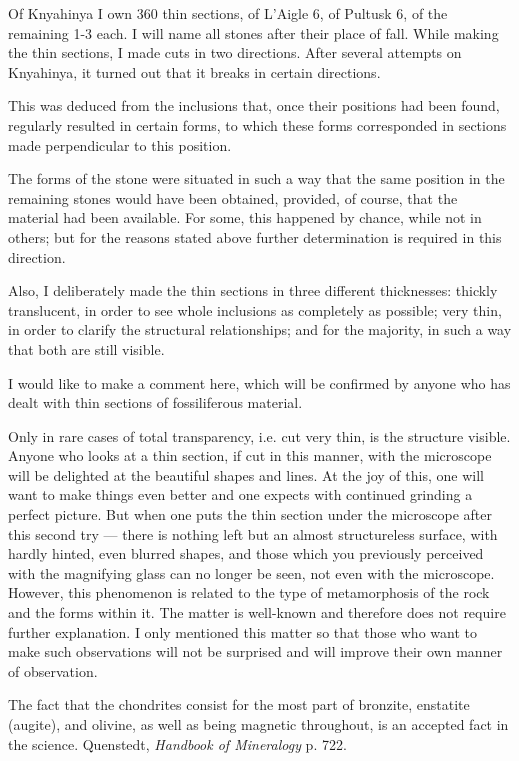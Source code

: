 \documentclass[a4paper, 12pt, oneside]{article}
\begin{document}
Of Knyahinya I own 360 thin sections, of L'Aigle 6, of Pultusk 6, of the remaining 1-3 each. I will name all stones after their place of fall. While making the thin sections, I made cuts in two directions. After several attempts on Knyahinya, it turned out that it breaks in certain directions.

This was deduced from the inclusions that, once their positions had been found, regularly resulted in certain forms, to which these forms corresponded in sections made perpendicular to this position.

The forms of the stone were situated in such a way that the same position in the remaining stones would have been obtained, provided, of course, that the material had been available. For some, this happened by chance, while not in others; but for the reasons stated above further determination is required in this direction.

Also, I deliberately made the thin sections in three different thicknesses: thickly translucent, in order to see whole inclusions as completely as possible; very thin, in order to clarify the structural relationships; and for the majority, in such a way that both are still visible.

I would like to make a comment here, which will be confirmed by anyone who has dealt with thin sections of fossiliferous material.

Only in rare cases of total transparency, i.e. cut very thin, is the structure visible. Anyone who looks at a thin section, if cut in this manner, with the microscope will be delighted at the beautiful shapes and lines. At the joy of this, one will want to make things even better and one expects with continued grinding a perfect picture. But when one puts the thin section under the microscope after this second try --- there is nothing left but an almost structureless surface, with hardly hinted, even blurred shapes, and those which you previously perceived with the magnifying glass can no longer be seen, not even with the microscope. However, this phenomenon is related to the type of metamorphosis of the rock and the forms within it. The matter is well-known and therefore does not require further explanation. I only mentioned this matter so that those who want to make such observations will not be surprised and will improve their own manner of observation.

The fact that the chondrites consist for the most part of bronzite, enstatite (augite), and olivine, as well as being magnetic throughout, is an accepted fact in the science. Quenstedt, \emph{Handbook of Mineralogy} p. 722.
\end{document}
